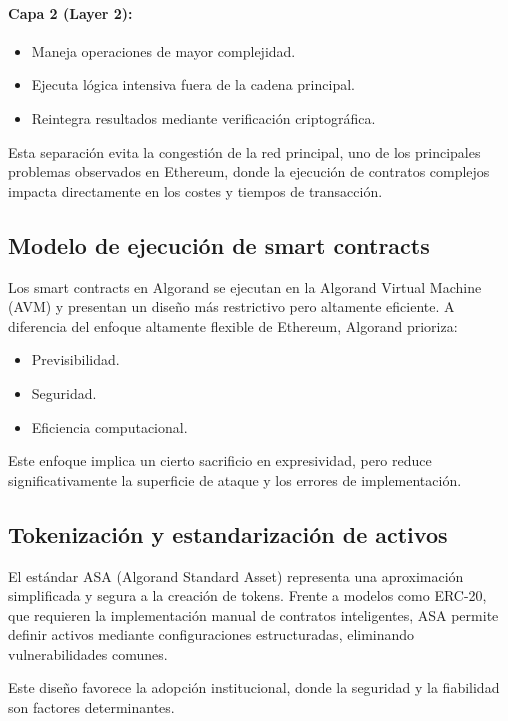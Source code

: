 \documentclass[12pt]{article}
\begin{document}
\paragraph{Capa 2 (Layer 2):}
\begin{itemize}
    \item Maneja operaciones de mayor complejidad.
    \item Ejecuta lógica intensiva fuera de la cadena principal.
    \item Reintegra resultados mediante verificación criptográfica.
\end{itemize}

Esta separación evita la congestión de la red principal, uno de los principales problemas observados en Ethereum, donde la ejecución de contratos complejos impacta directamente en los costes y tiempos de transacción.

\subsection{Modelo de ejecución de smart contracts}

Los smart contracts en Algorand se ejecutan en la Algorand Virtual Machine (AVM) y presentan un diseño más restrictivo pero altamente eficiente. A diferencia del enfoque altamente flexible de Ethereum, Algorand prioriza:
\begin{itemize}
    \item Previsibilidad.
    \item Seguridad.
    \item Eficiencia computacional.
\end{itemize}

Este enfoque implica un cierto sacrificio en expresividad, pero reduce significativamente la superficie de ataque y los errores de implementación.

\subsection{Tokenización y estandarización de activos}

El estándar ASA (Algorand Standard Asset) representa una aproximación simplificada y segura a la creación de tokens. Frente a modelos como ERC-20, que requieren la implementación manual de contratos inteligentes, ASA permite definir activos mediante configuraciones estructuradas, eliminando vulnerabilidades comunes.

Este diseño favorece la adopción institucional, donde la seguridad y la fiabilidad son factores determinantes.
\end{document}
